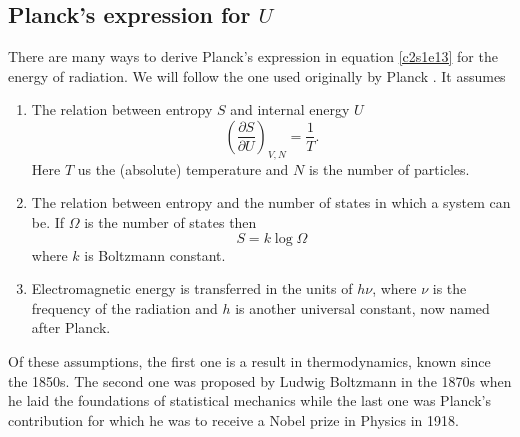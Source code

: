 \subsection{Planck's expression for $U$}
There are many ways to derive Planck's expression in equation \eqref{c2s1e13}
for the energy of radiation. We will follow the one used originally by Planck
\cite{planck1901law}. It assumes
\begin{enumerate}
\item The relation between entropy $S$ and internal energy $U$
\begin{equation}\label{c2s1e15}
\left(\frac{\partial S}{\partial U}\right)_{V, N} = \frac{1}{T}.
\end{equation}
Here $T$ us the (absolute) temperature and $N$ is the number of particles.
\item The relation between entropy and the number of states in which a system
can be. If $\Omega$ is the number of states then
\begin{equation}\label{c2s1e16}
S = k\log\Omega
\end{equation}
where $k$ is Boltzmann constant.
\item Electromagnetic energy is transferred in the units of $h\nu$, where $\nu$
is the frequency of the radiation and $h$ is another universal constant, now 
named after Planck. 
\end{enumerate}
Of these assumptions, the first one is a result in thermodynamics, known since 
the 1850s. The second one was proposed by Ludwig Boltzmann in the 1870s when he
laid the foundations of statistical mechanics while the last one was Planck's 
contribution for which he was to receive a Nobel prize in Physics in 1918.

